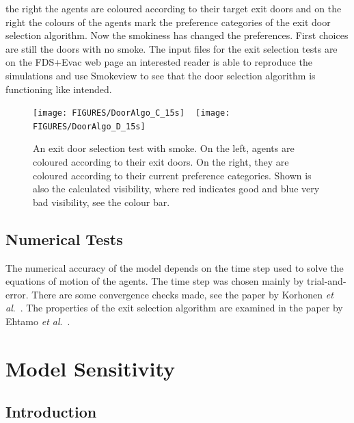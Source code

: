 \documentclass[12pt,a4paper,final,twoside]{stylevk}
\begin{document}
\begin{enumerate}
  the right the agents are coloured according to their target exit
  doors and on the right the colours of the agents mark the preference
  categories of the exit door selection algorithm.  Now the smokiness
  has changed the preferences.  First choices are still the doors with
  no smoke.  The input files for the exit selection tests are on the
  FDS+Evac web page an interested reader is able to reproduce the
  simulations and use Smokeview to see that the door selection
  algorithm is functioning like intended.
%
\begin{figure}[!tb]
  \centerline{\texttt{[image: FIGURES/DoorAlgo\_C\_15s]} ~ \texttt{[image: FIGURES/DoorAlgo\_D\_15s]}}  
  \caption{An exit door selection test with smoke.  On the left,
    agents are coloured according to their exit doors. On the right,
    they are coloured according to their current preference
    categories.  Shown is also the calculated visibility, where red
    indicates good and blue very bad visibility, see the colour
    bar.}\label{Fig_ExitDoorSmoke}
\end{figure}
%
%
\end{enumerate}
%


\section{Numerical Tests}\label{Sec_NumTest}

\noindent The numerical accuracy of the model depends on the time step
used to solve the equations of motion of the agents.  The time step
was chosen mainly by trial-and-error.  There are some convergence
checks made, see the paper by Korhonen \emph{et
  al}.~\cite{Korhonen08b}.  The properties of the exit selection
algorithm are examined in the paper by Ehtamo \emph{et
  al}.~\cite{Ehtamo2010}.

\clearpage

\newpage


\chapter{Model Sensitivity}\label{Sec_ModelSensi}


\section{Introduction}
\end{document}
